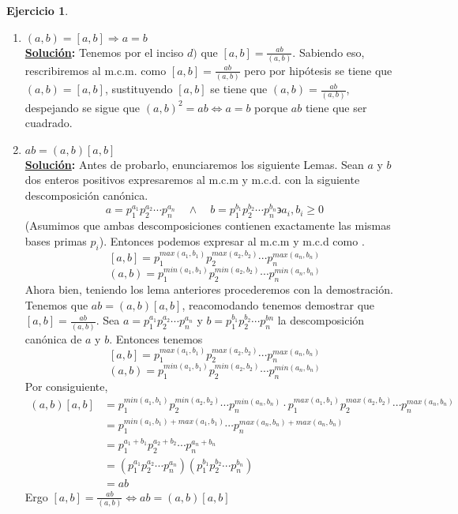 \documentclass[11pt,letterpaper]{article}
\theoremstyle{definition}\newtheorem{p}{Ejercicio}
\theoremstyle{definition}\newtheorem{pp}[p]{$(*)$Ejercicio}
\numberwithin{p}{section}
\newcommand{\ent}{\Longrightarrow}
\newcommand{\sol}{\textbf{\underline{Solución}: }} %
\begin{document}
\begin{p}
\begin{enumerate}
  \item $(a,b)=[a,b] \ent a=b$\\
  \sol Tenemos por el inciso $d)$ que $[a,b]=\frac{ab}{(a,b)}$. Sabiendo eso, rescribiremos al m.c.m. como 
  $[a,b] = \frac{ab}{(a,b)}$ pero por hipótesis se tiene que $(a,b)=[a,b]$, sustituyendo $[a,b]$ se tiene que 
  $(a,b) = \frac{ab}{(a,b)}$, despejando se sigue que $(a,b)^2 = ab \iff a=b$ porque $ab$ tiene que 
  ser cuadrado.
  
  \item $ab=(a,b)[a,b]$\\
  \sol Antes de probarlo, enunciaremos los siguiente Lemas. Sean $a$ y $b$ dos enteros positivos  
  expresaremos al m.c.m y m.c.d. con la siguiente descomposición canónica.
  $$a=p_{1}^{a_1}p_{2}^{a_2} \cdots p_{n}^{a_n} \quad \land  \quad b=p_{1}^{b_1}p_{2}^{b_2} \cdots p_{n}^{b_n} \backepsilon a_i,b_i \geq 0$$
  (Asumimos que ambas descomposiciones contienen exactamente las mismas bases primas $p_i$). 
  Entonces podemos expresar al m.c.m y m.c.d como .
  $$[a,b] =p_{1}^{max(a_1,b_1)}p_{2}^{max(a_2,b_2)} \cdots p_{n}^{max(a_n,b_n)}$$
  $$(a,b) =p_{1}^{min(a_1,b_1)}p_{2}^{min(a_2,b_2)} \cdots p_{n}^{min(a_n,b_n)}$$
  Ahora bien, teniendo los lema anteriores procederemos con la demostración.\\
  Tenemos que $ab=(a,b)[a,b]$, reacomodando tenemos demostrar que $[a,b]=\frac{ab}{(a,b)}$.
  Sea $a=p_{1}^{a_1}p_{2}^{a_2} \cdots p_{n}^{a_n}$ y $b=p_{1}^{b_1}p_{2}^{b_2} \cdots p_{n}^{bn}$ 
  la descomposición canónica de $a$ y $b$. Entonces tenemos
  $$[a,b] = p_{1}^{max(a_1,b_1)}p_{2}^{max(a_2,b_2)} \cdots p_{n}^{max(a_n,b_n)}$$
  $$(a,b) = p_{1}^{min(a_1,b_1)}p_{2}^{min(a_2,b_2)} \cdots p_{n}^{min(a_n,b_n)}$$
  Por consiguiente,
  \begin{align*}
  (a,b)[a,b]
    &= p_{1}^{min(a_1,b_1)}p_{2}^{min(a_2,b_2)} \cdots p_{n}^{min(a_n,b_n)} \cdot p_{1}^{max(a_1,b_1)}p_{2}^{max(a_2,b_2)} \cdots p_{n}^{max(a_n,b_n)} \\
    &= p_{1}^{min(a_1,b_1)+max(a_1,b_1)} \cdots p_{n}^{max(a_n,b_n)+max(a_n,b_n)} \\
    &= p_{1}^{a_1 + b_1}p_{2}^{a_2 + b_2} \cdots p_{n}^{a_n + b_n} \\
    &= (p_{1}^{a_1}p_{2}^{a_2} \cdots p_{n}^{a_n})(p_{1}^{b_1}p_{2}^{b_2} \cdots p_{n}^{b_n}) \\
    &= ab
  \end{align*}
  Ergo $[a,b]=\frac{ab}{(a,b)}  \iff ab=(a,b)[a,b]$  
  

\end{enumerate}
\end{p}
\end{document}
